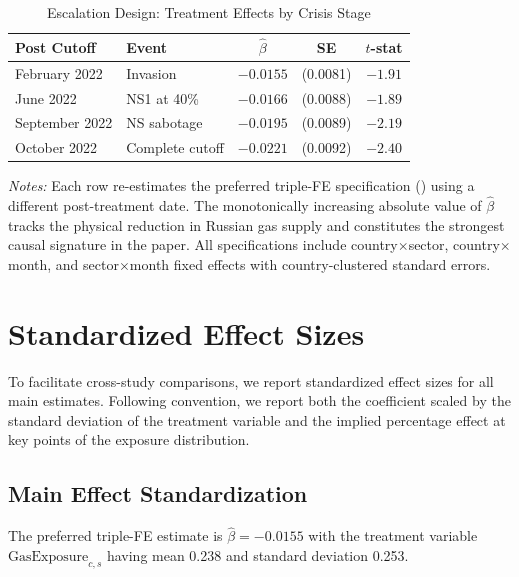 \documentclass[12pt]{article}
\begin{document}
\begin{table}[htbp]
\centering
\caption{Escalation Design: Treatment Effects by Crisis Stage}
\label{tab:escalation}
\begin{tabular}{llccc}
\hline\hline
Post Cutoff & Event & $\hat{\beta}$ & SE & $t$-stat \\
\hline
February 2022 & Invasion & $-0.0155$ & (0.0081) & $-1.91$ \\
June 2022 & NS1 at 40\% & $-0.0166$ & (0.0088) & $-1.89$ \\
September 2022 & NS sabotage & $-0.0195$ & (0.0089) & $-2.19$ \\
October 2022 & Complete cutoff & $-0.0221$ & (0.0092) & $-2.40$ \\
\hline\hline
\end{tabular}
\begin{minipage}{0.8\textwidth}
\footnotesize
\textit{Notes:} Each row re-estimates the preferred triple-FE specification () using a different post-treatment date. The monotonically increasing absolute value of $\hat{\beta}$ tracks the physical reduction in Russian gas supply and constitutes the strongest causal signature in the paper. All specifications include country$\times$sector, country$\times$month, and sector$\times$month fixed effects with country-clustered standard errors.
\end{minipage}
\end{table}


\section{Standardized Effect Sizes}
\label{app:effect_sizes}

To facilitate cross-study comparisons, we report standardized effect sizes for all main estimates. Following convention, we report both the coefficient scaled by the standard deviation of the treatment variable and the implied percentage effect at key points of the exposure distribution.

\subsection{Main Effect Standardization}

The preferred triple-FE estimate is $\hat{\beta} = -0.0155$ with the treatment variable $\text{GasExposure}_{c,s}$ having mean 0.238 and standard deviation 0.253.
\end{document}
